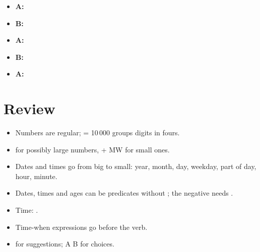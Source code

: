 \begin{example}\leavevmode
\begin{itemize}
  \item \textbf{A:} 
  \item \textbf{B:} 
  \item \textbf{A:} 
  \item \textbf{B:} 
  \item \textbf{A:} 
\end{itemize}
\end{example}

\section*{Review}
\begin{itemize}
  \item Numbers are regular;  = 10\,000 groups digits in fours.
  \item {} for possibly large numbers,  + MW for small ones.
  \item Dates and times go from big to small: year, month, day, weekday, part of day,
        hour, minute.
  \item Dates, times and ages can be predicates without ; the negative needs
        .
  \item Time: .
  \item Time-when expressions go before the verb.
  \item {} for suggestions; A  B for choices.
\end{itemize}
